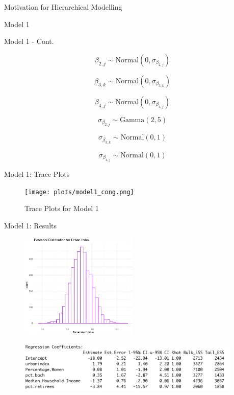 \documentclass{beamer}
\begin{document}
\begin{frame}{Motivation for Hierarchical Modelling}
\begin{frame}{Model 1}
\end{frame}

\begin{frame}{Model 1 - Cont.}

\[\beta_{2,j} \sim \text{Normal}(0, \sigma_{\beta_{2,j}})\]

\[\beta_{3,k} \sim \text{Normal}(0, \sigma_{\beta_{3,k}})\]

\[\beta_{4,j} \sim \text{Normal}(0, \sigma_{\beta_{4,j}})\]

\[\sigma_{\beta_{2,j}} \sim \text{Gamma}(2,5) \]

\[\sigma_{\beta_{3,k}} \sim \text{Normal}(0,1) \]

\[\sigma_{\beta_{4,j}} \sim \text{Normal}(0,1) \]

\end{frame}

\begin{frame}{Model 1: Trace Plots}
    \begin{center}
        \begin{figure}
            \texttt{[image: plots/model1\_cong.png]}
            \caption{Trace Plots for Model 1}
        \end{figure}
    \end{center}
\end{frame}


\begin{frame}{Model 1: Results}
    \begin{center}
        \begin{figure}
            \includegraphics[width=0.5\textwidth]{plots/post_urbanindex_model1.png}
        \end{figure}
        \begin{figure}
            \includegraphics[width=0.95\textwidth]{plots/model1_summary_output.png}
        \end{figure}
    \end{center}
\end{frame}



\end{frame}
\end{document}
